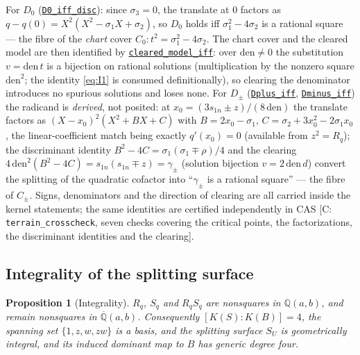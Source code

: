 \documentclass[11pt]{amsart}
\newtheorem{proposition}[theorem]{Proposition}
\newcommand{\Q}{\mathbb{Q}}
\newcommand{\repourl}{https://github.com/hirokifukui/rd-quartics-classification}
\newcommand{\repotag}{v1.1.0}
\newcommand{\leanline}[3]{\href{\repourl/blob/\repotag/#1\#L#2}{\texttt{#3}}}
\begin{document}
For $D_{0}$
(\leanline{Gap/BMThm7Fibre.lean}{51}{D0\_iff\_disc}): since
$\sigma_{3}=0$, the translate at $0$ factors as
$q-q(0)=X^{2}(X^{2}-\sigma_{1}X+\sigma_{2})$, so $D_{0}$ holds iff
$\sigma_{1}^{2}-4\sigma_{2}$ is a rational square --- the fibre of the
\emph{chart} cover $C_{0}\colon t^{2}=\sigma_{1}^{2}-4\sigma_{2}$.  The
chart cover and the cleared model are then identified by
\leanline{Gap/BMThm7Fibre.lean}{98}{cleared\_model\_iff}: over
$\mathrm{den}\neq0$ the substitution $v=\mathrm{den}\,t$ is a bijection
on rational solutions (multiplication by the nonzero square
$\mathrm{den}^{2}$; the identity \eqref{eq:I1} is consumed
definitionally), so clearing the denominator introduces no spurious
solutions and loses none.  For $D_{\pm}$
(\leanline{Gap/BMThm7Fibre.lean}{117}{Dplus\_iff},
\leanline{Gap/BMThm7Fibre.lean}{204}{Dminus\_iff}) the radicand is
\emph{derived}, not posited: at
$x_{0}=(3s_{1n}\pm z)/(8\,\mathrm{den})$ the translate factors as
$(X-x_{0})^{2}(X^{2}+BX+C)$ with $B=2x_{0}-\sigma_{1}$,
$C=\sigma_{2}+3x_{0}^{2}-2\sigma_{1}x_{0}$, the linear-coefficient
match being exactly $q'(x_{0})=0$ (available from $z^{2}=R_{q}$); the
discriminant identity $B^{2}-4C=\sigma_{1}(\sigma_{1}\mp\rho)/4$ and
the clearing
$4\,\mathrm{den}^{2}(B^{2}-4C)=s_{1n}(s_{1n}\mp z)=\gamma_{\pm}$
(solution bijection $v=2\,\mathrm{den}\,d$) convert the splitting of
the quadratic cofactor into ``$\gamma_{\pm}$ is a rational square'' ---
the fibre of $C_{\pm}$.  Signs, denominators and the direction of
clearing are all carried inside the kernel statements; the same
identities are certified independently in CAS [C:
\texttt{terrain\_crosscheck}, seven checks covering the critical
points, the factorizations, the discriminant identities and the
clearing].

\subsection{Integrality of the splitting surface}
\label{sec:boundary:integral}

\begin{proposition}[Integrality]\label{prop:S_integral}
$R_{q}$, $S_{q}$ and $R_{q}S_{q}$ are nonsquares in $\Q(a,b)$, and
remain nonsquares in $\overline{\Q}(a,b)$.  Consequently
$[K(S):K(B)]=4$, the spanning set $\{1,z,w,zw\}$ is a basis, and the
splitting surface $S_{U}$ is geometrically integral, and its induced
dominant map to $B$ has generic degree four.
\end{proposition}
\end{document}
